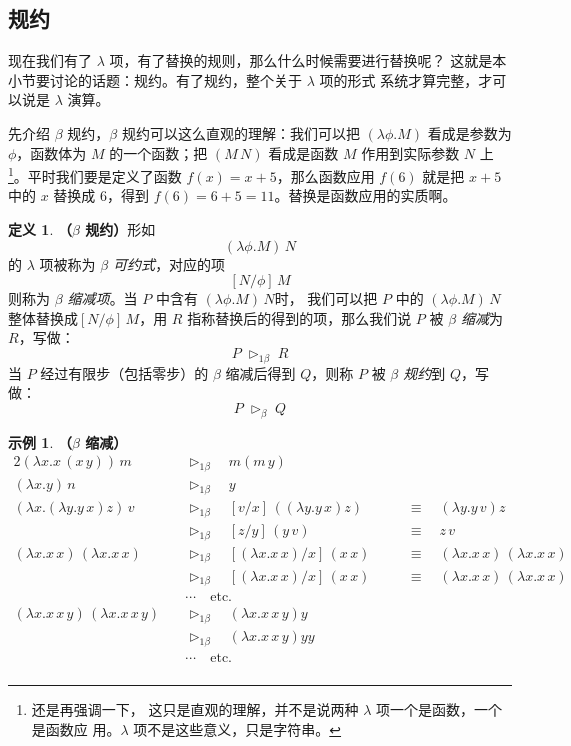 \documentclass[a4paper,adobefonts]{ctexart}
\theoremstyle{definition}
\newtheorem{definition}{定义}
\newtheorem{example}{示例}
\begin{document}
\subsection{规约}

现在我们有了 $\lambda$ 项，有了替换的规则，那么什么时候需要进行替换呢？
这就是本小节要讨论的话题：规约。有了规约，整个关于 $\lambda$ 项的形式
系统才算完整，才可以说是 $\lambda$ 演算。

先介绍 $\beta$ 规约，$\beta$ 规约可以这么直观的理解：我们可以把
$(\lambda\phi.M)$ 看成是参数为 $\phi$，函数体为 $M$ 的一个函数；把
$(M\,N)$ 看成是函数 $M$ 作用到实际参数 $N$ 上\footnote{还是再强调一下，
  这只是直观的理解，并不是说两种 $\lambda$ 项一个是函数，一个是函数应
  用。$\lambda$ 项不是这些意义，只是字符串。}。平时我们要是定义了函数
$f(x)=x+5$，那么函数应用 $f(6)$ 就是把 $x+5$ 中的 $x$ 替换成 6，得到
$f(6)=6+5=11$。替换是函数应用的实质啊。

\begin{definition}{\bfseries{（$\beta$ 规约）}}\label{def:betareduce}
  形如
  $$
  (\lambda\phi.M)\,N
  $$
  的 $\lambda$ 项被称为 \emph{$\beta$ 可约式}，对应的项
  $$
  [N/\phi]\,M
  $$则称为 \emph{$\beta$ 缩减项}。当 $P$ 中含有 $(\lambda\phi.M)\,N$时，
  我们可以把 $P$ 中的 $(\lambda\phi.M)\,N$ 整体替换成$[N/\phi]\,M$，用
  $R$ 指称替换后的得到的项，那么我们说 $P$ 被 \emph{$\beta$ 缩减}为
  $R$，写做：
  $$
  P\;\triangleright_{1\beta}\;R
  $$当 $P$ 经过有限步（包括零步）的 $\beta$ 缩减后得到 $Q$，则称 $P$
  被 \emph{$\beta$ 规约}到 $Q$，写做：
  $$
  P\;\triangleright_\beta\;Q
  $$
\end{definition}

\newcommand{\betac}{\triangleright_{1\beta}}
\newcommand{\betar}{\triangleright_\beta}
\newcommand{\betae}{=_\beta}

\begin{example}{\bfseries{（$\beta$ 缩减）}}\label{example:beta}
  \begin{alignat*}{2}
    (\lambda x.x\,(x\,y))\,m \quad &\betac\quad  m(m\,y) \\
    (\lambda x.y)\,n \quad &\betac\quad y \\
    (\lambda x.(\lambda y.y\,x)z)\,v\quad &\betac\quad [v/x]\,((\lambda y.y\,x)z) & &\equiv\quad (\lambda y.y\,v)z\\
    &\betac\quad [z/y]\,(y\,v)&\quad &\equiv\quad z\,v \\
    (\lambda x.x\,x)\,(\lambda x.x\,x)\quad &\betac\quad [(\lambda x.x\,x)/x]\,(x\,x) & &\equiv\quad (\lambda x.x\,x)\,(\lambda x.x\,x)\\
    &\betac\quad [(\lambda x.x\,x)/x]\,(x\,x) & &\equiv\quad (\lambda x.x\,x)\,(\lambda x.x\,x)\\
    &\cdots\quad \text{etc.}\\
    (\lambda x.x\,x\,y)\,(\lambda x.x\,x\,y)\quad &\betac\quad (\lambda x.x\,x\,y)y\\
    &\betac\quad (\lambda x.x\,x\,y)yy \\
    &\cdots\quad \text{etc.} \\
  \end{alignat*}
\end{example}
\end{document}
